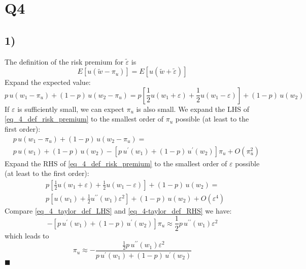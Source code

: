 \documentclass{article}
\begin{document}
	\section*{Q4}
	\subsection*{1)} The definition of the risk premium for $\tilde{\varepsilon}$ is
\begin{equation}
	E\left[ u\left(\tilde{w}-\pi _u\right) \right] = E \left[  u\left(\tilde{w} + \tilde{\varepsilon}\right) \right]
\end{equation}
Expand the expected value:
\begin{equation}
	\label{eq_4_def_risk_premium}
	p \,u(w_1 - \pi_u) + (1-p)\, u(w_2 - \pi_u) = p \left[ \frac{1}{2} u(w_1 + \varepsilon) + \frac{1}{2}u(w_1-\varepsilon)\right] + (1-p) \,u(w_2)
\end{equation}
If $\varepsilon$ is sufficiently small, we can expect $\pi_u$ is also small. We expand the LHS of \eqref{eq_4_def_risk_premium} to the smallest order of $\pi_u$ possible (at least to the first order):
\begin{equation}
	\label{eq_4_taylor_def_LHS}
	\begin{aligned}
		& p\, u(w_1 - \pi_u) + (1-p)\, u(w_2 - \pi_u) = \\
		& p \,u(w_1) + (1-p)\, u(w_2) - \left[p \,u^{\prime}(w_1) + (1-p)\, u^{\prime}(w_2)\right] \pi_u + O\left( \pi_u^{2} \right)
	\end{aligned}
\end{equation}
Expand the RHS of \eqref{eq_4_def_risk_premium} to the smallest order of $\varepsilon$ possible (at least to the first order):
\begin{equation}
	\label{eq_4-taylor_def_RHS}
	\begin{aligned}
		& p \left[ \frac{1}{2} u(w_1 + \varepsilon) + \frac{1}{2}u(w_1-\varepsilon)\right] + (1-p)\, u(w_2) = \\
		& p \left[ u(w_1) + \frac{1}{2}u^{\prime\prime}(w_1)\varepsilon^2 \right] + (1-p)\, u(w_2) + O(\varepsilon^4)
	\end{aligned}
\end{equation}
Compare \eqref{eq_4_taylor_def_LHS} and \eqref{eq_4-taylor_def_RHS} we have:
\begin{equation}
	- \left[p\, u^{\prime}(w_1) + (1-p)\, u^{\prime}(w_2)\right] \pi_u \approx  \frac{1}{2}p\,u^{\prime\prime}(w_1)\varepsilon^2
\end{equation}
which leads to
\begin{equation}
	\pi_u \approx -\frac{\frac{1}{2}p\,u^{\prime\prime}(w_1)\varepsilon^2}{p\, u^{\prime}(w_1) + (1-p)\, u^{\prime}(w_2)}
\end{equation}
$\blacksquare$
\end{document}
